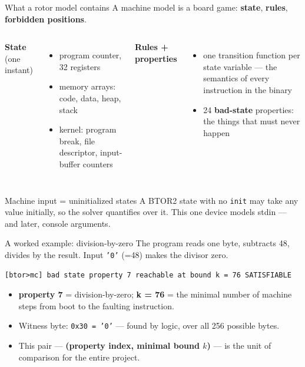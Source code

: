 \documentclass[aspectratio=169]{beamer}
\newcommand{\key}[1]{\textbf{\color{accentdk}#1}}
\begin{document}
\begin{frame}{What a rotor model contains}
  A machine model is a board game: \key{state}, \key{rules},
  \key{forbidden positions}.
  \vspace{0.3em}
  \begin{columns}[T]
      \textbf{State} (one instant)
      \begin{itemize}\setlength\itemsep{0.15em}\footnotesize
        \item program counter, 32 registers
        \item memory arrays: code, data, heap, stack
        \item kernel: program break, file descriptor, input-buffer counters
      \end{itemize}
      \textbf{Rules + properties}
      \begin{itemize}\setlength\itemsep{0.15em}\footnotesize
        \item one transition function per state variable --- the semantics of
              every instruction in the binary
        \item 24 \key{bad-state} properties: the things that must never happen
      \end{itemize}
  \end{columns}
  \vspace{0.4em}
  \begin{block}{Machine input = uninitialized states}
    A BTOR2 state with no \texttt{init} may take any value initially, so the
    solver quantifies over it. This one device models stdin --- and later,
    \alert{console arguments}.
  \end{block}
\end{frame}

\begin{frame}[fragile]{A worked example: division-by-zero}
  The program reads one byte, subtracts 48, divides by the result. Input
  \texttt{'0'} (=48) makes the divisor zero.
  \begin{lstlisting}
[btor>mc] bad state property 7 reachable at bound k = 76 SATISFIABLE
  \end{lstlisting}
  \vspace{-0.3em}
  \begin{itemize}\setlength\itemsep{0.25em}\footnotesize
    \item \key{property 7} = division-by-zero; \key{k = 76} = the minimal
          number of machine steps from boot to the faulting instruction.
    \item Witness byte: \texttt{0x30 = '0'} --- found by logic, over all 256
          possible bytes.
    \item This pair --- \key{(property index, minimal bound $k$)} --- is the
          unit of comparison for the entire project.
  \end{itemize}
\end{frame}
\end{document}
